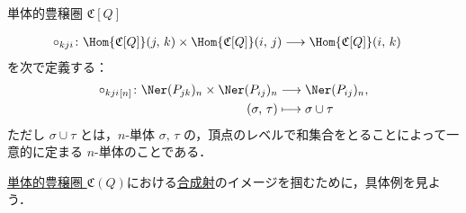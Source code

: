 \documentclass[TQFT_main]{subfiles}
\begin{document}
\begin{mydef}[label=def:PathCat,breakable]{単体的豊穣圏 {$\mathfrak{C}[Q]$}}
\begin{itemize}
    \begin{align}
        \circ_{kji} \colon \Hom{\mathfrak{C}[Q]}(j,\, k) \times \Hom{\mathfrak{C}[Q]}(i,\, j) &\lto \Hom{\mathfrak{C}[Q]}(i,\, k)
    \end{align}
    を次で定義する：
    \begin{align}
        \circ_{kji}{}_{[n]} \colon \Ner (P_{jk})_n \times \Ner (P_{ij})_n &\lto \Ner (P_{ij})_n, \\
        (\sigma,\, \tau) &\lmto \sigma \cup \tau
    \end{align}
    ただし $\sigma \cup \tau$ とは，$n$-単体 $\sigma,\, \tau$ の，頂点のレベルで和集合をとることによって一意的に定まる $n$-単体のことである．
\end{itemize}    
\end{mydef}

\hyperref[def:PathCat]{単体的豊穣圏 $\mathfrak{C}(Q)$}における\hyperref[def:enriched]{合成射}のイメージを掴むために，具体例を見よう．
\end{document}
